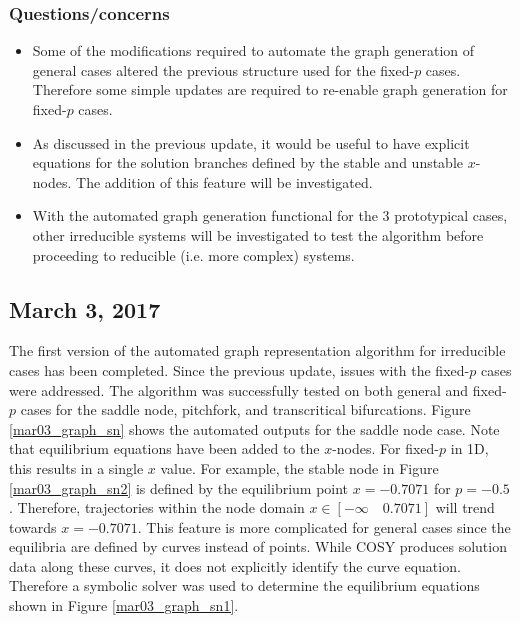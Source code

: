 \documentclass[12pt]{article}
\begin{document}
\subsubsection{Questions/concerns}
\begin{itemize}
\item Some of the modifications required to automate the graph generation of general cases altered the previous structure used for the fixed-$p$ cases. Therefore some simple updates are required to re-enable graph generation for fixed-$p$ cases.
\item As discussed in the previous update, it would be useful to have explicit equations for the solution branches defined by the stable and unstable $x$-nodes. The addition of this feature will be investigated. 
\item With the automated graph generation functional for the 3 prototypical cases, other irreducible systems will be investigated to test the algorithm before proceeding to reducible (i.e. more complex) systems.
\end{itemize}


\subsection{March 3, 2017}
The first version of the automated graph representation algorithm  for irreducible cases has been completed. Since the previous update, issues with the fixed-$p$ cases were addressed. The algorithm was successfully tested on both general and fixed-$p$ cases for the saddle node, pitchfork, and transcritical bifurcations. Figure \ref{mar03_graph_sn} shows the automated outputs for the saddle node case. Note that equilibrium equations have been added to the $x$-nodes. For fixed-$p$ in 1D, this results in a single $x$ value. For example, the stable node in Figure \ref{mar03_graph_sn2} is defined by the equilibrium point $x=-0.7071$ for $p=-0.5$. Therefore, trajectories within the node domain $x\in [-\infty \quad 0.7071]$ will trend towards $x=-0.7071$. This feature is more complicated for general cases since the equilibria are defined by curves instead of points. While COSY produces solution data along these curves, it does not explicitly identify the curve equation. Therefore a symbolic solver was used to determine the equilibrium equations shown in Figure \ref{mar03_graph_sn1}.
\end{document}

